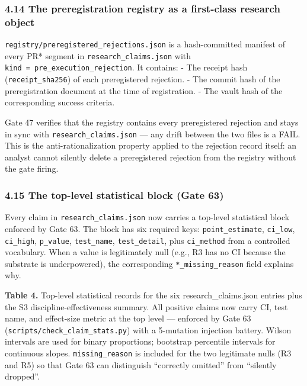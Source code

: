 \documentclass[
]{article}
\begin{document}
\subsubsection{4.14 The preregistration registry as a first-class
research
object}\label{the-preregistration-registry-as-a-first-class-research-object}

\texttt{registry/preregistered\_rejections.json} is a hash-committed
manifest of every PR* segment in \texttt{research\_claims.json} with
\texttt{kind\ =\ pre\_execution\_rejection}. It contains: - The receipt
hash (\texttt{receipt\_sha256}) of each preregistered rejection. - The
commit hash of the preregistration document at the time of registration.
- The vault hash of the corresponding success criteria.

Gate 47 verifies that the registry contains every preregistered
rejection and stays in sync with \texttt{research\_claims.json} --- any
drift between the two files is a FAIL. This is the anti-rationalization
property applied to the rejection record itself: an analyst cannot
silently delete a preregistered rejection from the registry without the
gate firing.

\subsubsection{4.15 The top-level statistical block (Gate
63)}\label{the-top-level-statistical-block-gate-63}

Every claim in \texttt{research\_claims.json} now carries a top-level
statistical block enforced by Gate 63. The block has six required keys:
\texttt{point\_estimate}, \texttt{ci\_low}, \texttt{ci\_high},
\texttt{p\_value}, \texttt{test\_name}, \texttt{test\_detail}, plus
\texttt{ci\_method} from a controlled vocabulary. When a value is
legitimately null (e.g., R3 has no CI because the substrate is
underpowered), the corresponding \texttt{*\_missing\_reason} field
explains why.

\textbf{Table 4.} Top-level statistical records for the six
research\_claims.json entries plus the S3 discipline-effectiveness
summary. All positive claims now carry CI, test name, and effect-size
metric at the top level --- enforced by Gate 63
(\texttt{scripts/check\_claim\_stats.py}) with a 5-mutation injection
battery. Wilson intervals are used for binary proportions; bootstrap
percentile intervals for continuous slopes. \texttt{missing\_reason} is
included for the two legitimate nulls (R3 and R5) so that Gate 63 can
distinguish ``correctly omitted'' from ``silently dropped''.
\end{document}
